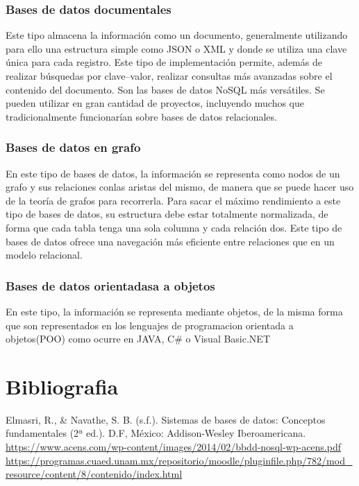 \documentclass[12pts, A3 ,twosides]{article}
\begin{document}
\subsubsection{Bases de datos documentales}
Este  tipo almacena la información como un documento, generalmente  utilizando para ello una estructura simple como JSON o XML y donde se utiliza una clave única para cada registro. Este tipo de implementación permite,  además  de  realizar  búsquedas  por  clave–valor,  realizar  consultas  más  avanzadas  sobre  el contenido del documento. 
Son las bases de datos NoSQL más versátiles. Se pueden utilizar en gran cantidad de proyectos, incluyendo muchos que tradicionalmente funcionarían sobre bases de datos relacionales.

\subsubsection{Bases de datos en grafo}
En este tipo de bases de datos, la información se representa como nodos de un grafo y sus relaciones conlas aristas del mismo, de manera que se puede hacer uso de la teoría de grafos para recorrerla. Para sacar el máximo rendimiento a este tipo de bases de datos, su estructura debe estar totalmente normalizada, de forma que cada tabla tenga una sola columna y cada relación dos. Este  tipo  de  bases  de  datos  ofrece  una  navegación  más  eficiente  entre  relaciones  que  en  un  modelo relacional.

\subsubsection{Bases de datos orientadasa a objetos}
En este tipo, la información se representa mediante objetos, de la misma forma que son representados en los lenguajes de programacion orientada a objetos(POO) como ocurre en JAVA, C\# o  Visual Basic.NET
\newpage
\section*{Bibliografia}
Elmasri, R., \& Navathe, S. B. (s.f.). Sistemas de bases de datos: Conceptos fundamentales (2ª ed.). D.F, México: Addison-Wesley Iberoamericana.\\

\url{https://www.acens.com/wp-content/images/2014/02/bbdd-nosql-wp-acens.pdf}\\

\url{https://programas.cuaed.unam.mx/repositorio/moodle/pluginfile.php/782/mod_resource/content/8/contenido/index.html}
\end{document}
